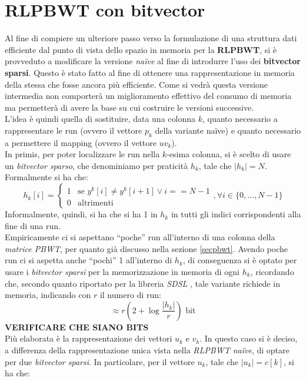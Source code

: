 \section{RLPBWT con bitvector}
\label{secrlpbwtbv}
Al fine di compiere un ulteriore passo verso la formulazione di una struttura
dati efficiente dal punto di vista dello spazio in memoria per la
\textbf{RLPBWT}, si è provveduto a modificare la versione \textit{na\"{i}ve} al
fine 
di introdurre l'uso dei \textbf{bitvector sparsi}. Questo è stato fatto al fine
di 
ottenere una rappresentazione in memoria della stessa che fosse ancora più
efficiente. Come si vedrà questa versione intermedia non comporterà un
miglioramento effettivo del consumo di memoria ma permetterà di avere la base su
cui costruire le versioni successive.\\
L'idea è quindi quella di sostituire, data una colonna $k$, quanto necessario a
rappresentare le run (ovvero il vettore $p_k$ della variante na\"{i}ve) e quanto
necessario a permettere il mapping (ovvero il vettore $uv_k$).\\
In primis, per poter localizzare le run nella $k$-esima colonna, si è scelto di
usare un \textit{bitvector sparso}, che denominiamo per praticità $h_k$, tale
che $|h_k|=N$. Formalmente si ha che:
\[h_k[i]=
  \begin{cases}
    1&\mbox{se } y^k[i]\neq y^k[i+1]\lor i==N-1\\
    0&\mbox{altrimenti}
  \end{cases},\forall i\in \{0,\ldots,N-1\}
\]
Informalmente, quindi, si ha che si ha 1 in $h_k$ in tutti gli indici
corrispondenti alla fine di una run.\\
Empiricamente ci si aspettano ``poche'' run all'interno di una colonna della
\textit{matrice PBWT}, per quanto già discusso nella sezione
\ref{secpbwt}. Avendo poche run ci si aspetta anche ``pochi'' 1 all'interno di
$h_k$, di conseguenza si è optato per usare i \textit{bitvector sparsi} per la
memorizzazione in memoria di ogni $h_k$, ricordando che, secondo quanto
riportato per la libreria \textit{SDSL} \cite{sdsl}, tale variante richiede in
memoria, indicando con $r$ il numero di run:
\[\approx r\left(2+\log\frac{|h_k|}{r}\right)\mbox{ bit}\]
\textbf{VERIFICARE CHE SIANO BITS}\\
Più elaborata è la rappresentazione dei vettori $u_k$ e $v_k$. In questo caso si
è deciso, a differenza della rappresentazione unica vista nella \textit{RLPBWT
  na\"{i}ve}, di optare per due \textit{bitvector sparsi}. In particolare, per il
vettore $u_k$, tale che $|u_k|=c[k]$, si ha che:
